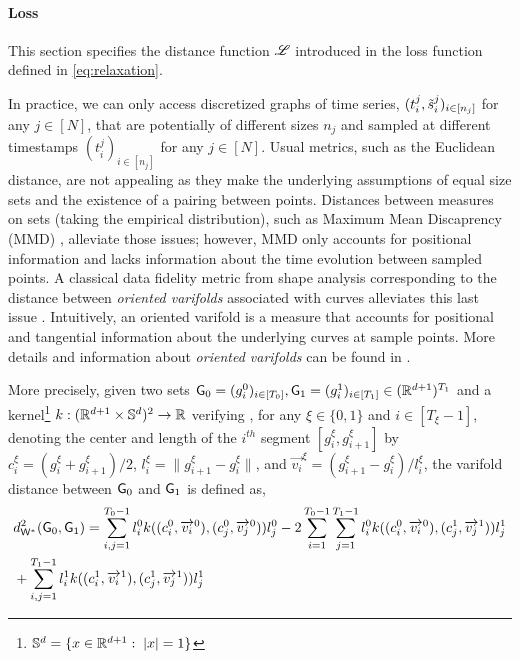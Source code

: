  



\paragraph{Loss}

This section specifies the distance function $\mathscr{L}$ introduced in the loss function defined in \eqref{eq:relaxation}. 

In practice, we can only access discretized graphs of time series, $(t_i^j,\tilde{s}^j_i)_{i\in[n_j]}$ for any $j\in[N]$, that are potentially of 
different sizes $n_j$ and sampled at different timestamps $(t_i^j)_{i\in[n_j]}$ for any $j\in[N]$.
 Usual metrics, such as the Euclidean distance, are not appealing as they 
make the underlying assumptions of equal size sets and the existence of a pairing between points.
 Distances between measures on 
sets (taking the empirical distribution), such as Maximum Mean Discaprency (MMD) \cite{dziugaite2015training,borgwardt2006integrating}, alleviate those issues; however, MMD only accounts for positional information 
and lacks information about the time evolution between sampled points.
 A classical data fidelity metric from shape analysis 
corresponding to the distance between \textit{oriented varifolds} associated with curves alleviates this last issue \cite{kaltenmark2017general}.  
Intuitively, an oriented varifold is a measure that accounts for positional and tangential information about the underlying 
curves at sample points. More details and information about \textit{oriented varifolds} can be found in . 

More precisely, given two sets $\mathsf{G}_0=(g_i^0)_{i\in[T_0]},\mathsf{G}_1=(g_i^1)_{i\in[T_1]}\in (\mathbb{R}^{d+1})^{T_1}$ and a kernel\footnote{$\mathbb{S}^d=\{x\in\mathbb{R}^{d+1}:\; |x|=1\}$} $k:(\mathbb{R}^{d+1} \times \mathbb{S}^d)^2\to \mathbb{R}$
verifying \citep[Proposition 2 \& 4]{kaltenmark2017general}, for any $\xi\in\{0,1\}$ and $i\in[T_\xi-1]$, denoting the center and length of the $i^{th}$ segment $[g_i^\xi,g_{i+1}^\xi]$ by
$c_i^\xi = (g_i^\xi + g_{i+1}^\xi)/2$, $l_i^\xi = \| g_{i+1}^\xi-g_{i}^\xi\|$, and 
$\overrightarrow{v_i}^\xi = (g_{i+1}^\xi-g_{i}^\xi)/l_i^\xi$, the varifold distance between $\mathsf{G}_0$ and $\mathsf{G}_1$  is defined as,
\begin{align}
  &d_{\mathsf{W}^*}^2(\mathsf{G}_0,\mathsf{G}_1) = \sum_{i,j = 1}^{T_0-1}l^0_i k((c^0_i,\overrightarrow{v_i}^0),(c^0_j,\overrightarrow{v_j}^0))l^0_j
  - 2 \sum_{i=1}^{T_0-1}\sum_{j=1}^{T_1-1}l^0_i k((c^0_i,\overrightarrow{v_i}^0),(c^1_j,\overrightarrow{v_j}^1))l^1_j \\
  &+ \sum_{i,j = 1}^{T_1-1}l^1_i k((c^1_i,\overrightarrow{v_i}^1),(c^1_j,\overrightarrow{v_j}^1))l^1_j 
\end{align}

